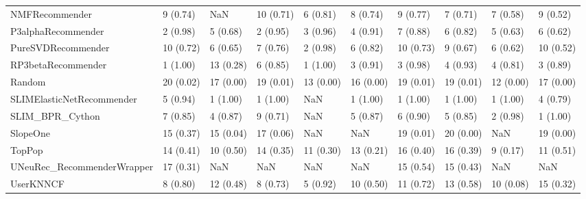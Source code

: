 \begin{tabular}{llllllllll}
                     NMFRecommender &                 9 (0.74) &         NaN &     10 (0.71) &     6 (0.81) &             8 (0.74) &            9 (0.77) &          7 (0.71) &           7 (0.58) &          9 (0.52) \\
                 P3alphaRecommender &                 2 (0.98) &    5 (0.68) &      2 (0.95) &     3 (0.96) &             4 (0.91) &            7 (0.88) &          6 (0.82) &           5 (0.63) &          6 (0.62) \\
                 PureSVDRecommender &                10 (0.72) &    6 (0.65) &      7 (0.76) &     2 (0.98) &             6 (0.82) &           10 (0.73) &          9 (0.67) &           6 (0.62) &         10 (0.52) \\
                 RP3betaRecommender &                 1 (1.00) &   13 (0.28) &      6 (0.85) &     1 (1.00) &             3 (0.91) &            3 (0.98) &          4 (0.93) &           4 (0.81) &          3 (0.89) \\
                             Random &                20 (0.02) &   17 (0.00) &     19 (0.01) &    13 (0.00) &            16 (0.00) &           19 (0.01) &         19 (0.01) &          12 (0.00) &         17 (0.00) \\
          SLIMElasticNetRecommender &                 5 (0.94) &    1 (1.00) &      1 (1.00) &          NaN &             1 (1.00) &            1 (1.00) &          1 (1.00) &           1 (1.00) &          4 (0.79) \\
                    SLIM\_BPR\_Cython &                 7 (0.85) &    4 (0.87) &      9 (0.71) &          NaN &             5 (0.87) &            6 (0.90) &          5 (0.85) &           2 (0.98) &          1 (1.00) \\
                           SlopeOne &                15 (0.37) &   15 (0.04) &     17 (0.06) &          NaN &                  NaN &           19 (0.01) &         20 (0.00) &                NaN &         19 (0.00) \\
                             TopPop &                14 (0.41) &   10 (0.50) &     14 (0.35) &    11 (0.30) &            13 (0.21) &           16 (0.40) &         16 (0.39) &           9 (0.17) &         11 (0.51) \\
         UNeuRec\_RecommenderWrapper &                17 (0.31) &         NaN &           NaN &          NaN &                  NaN &           15 (0.54) &         15 (0.43) &                NaN &               NaN \\
                          UserKNNCF &                 8 (0.80) &   12 (0.48) &      8 (0.73) &     5 (0.92) &            10 (0.50) &           11 (0.72) &         13 (0.58) &          10 (0.08) &         15 (0.32) \\
\bottomrule
\end{tabular}
